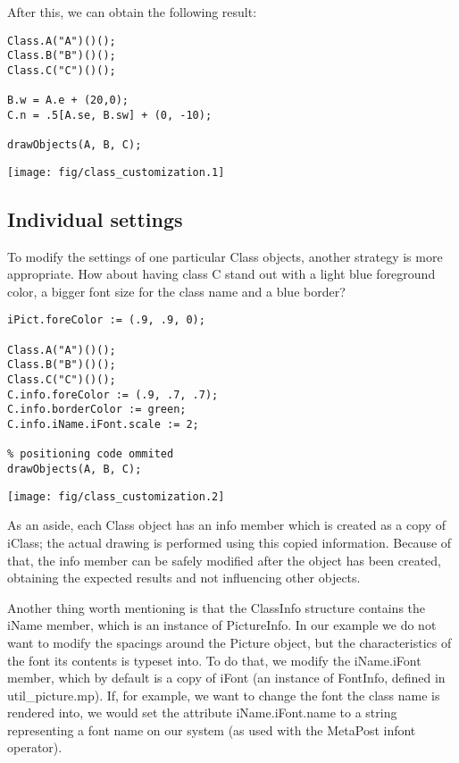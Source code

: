 \documentclass{article}
\newcommand{\code}{\ttfamily}
\begin{document}
After this, we can obtain the following result:

\begin{multicols}{2}
\begin{verbatim}
Class.A("A")()();
Class.B("B")()();
Class.C("C")()();

B.w = A.e + (20,0);
C.n = .5[A.se, B.sw] + (0, -10);

drawObjects(A, B, C);
\end{verbatim}
\columnbreak
\hspace{1cm}\texttt{[image: fig/class\_customization.1]}
\end{multicols}

\subsection{Individual settings}

To modify the settings of one particular {\code Class} objects, another strategy is more appropriate. How about having class
{\code C} stand out with a light blue foreground color, a bigger font size for the class name and a blue border?

\begin{multicols}{2}
\begin{verbatim}
iPict.foreColor := (.9, .9, 0);

Class.A("A")()();
Class.B("B")()();
Class.C("C")()();
C.info.foreColor := (.9, .7, .7);
C.info.borderColor := green;
C.info.iName.iFont.scale := 2;

% positioning code ommited
drawObjects(A, B, C);
\end{verbatim}
\columnbreak
\hspace{1cm}\texttt{[image: fig/class\_customization.2]}
\end{multicols}

As an aside, each {\code Class} object has an {\code info} member which is created as
a copy of {\code iClass}; the actual drawing is performed using this copied
information. Because of that, the {\code info} member can be safely modified after the object
has been created, obtaining the expected results and not influencing other objects.

Another thing worth mentioning is that the {\code ClassInfo} structure contains
the {\code iName} member, which is an instance of {\code PictureInfo}. In our example we
do not want to modify the spacings around the {\code Picture} object,
but the characteristics of the font its contents is typeset into. To do that,
we modify the {\code iName.iFont} member, which by default is a copy of {\code iFont}
(an instance of {\code FontInfo}, defined in {\code util\_picture.mp}).
If, for example, we want to change the font the class name is rendered into, we would set
the attribute {\code iName.iFont.name} to a string representing a font name
on our system (as used with the MetaPost {\code infont} operator).
\end{document}
